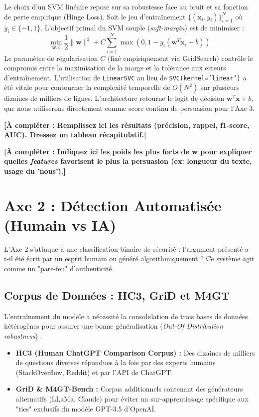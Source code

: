 \documentclass[11pt,a4paper]{article}
\begin{document}
Le choix d'un SVM linéaire repose sur sa robustesse face au bruit et sa fonction de perte empirique (Hinge Loss). Soit le jeu d'entraînement $\{(\mathbf{x}_i, y_i)\}_{i=1}^N$ où $y_i \in \{-1, 1\}$. L'objectif primal du SVM souple (\textit{soft-margin}) est de minimiser :
\begin{equation}
    \min_{\mathbf{w}, b} \frac{1}{2} \|\mathbf{w}\|^2 + C \sum_{i=1}^N \max(0, 1 - y_i(\mathbf{w}^T \mathbf{x}_i + b))
\end{equation}
Le paramètre de régularisation $C$ (fixé empiriquement via GridSearch) contrôle le compromis entre la maximisation de la marge et la tolérance aux erreurs d'entraînement. L'utilisation de \texttt{LinearSVC} au lieu de \texttt{SVC(kernel='linear')} a été vitale pour contourner la complexité temporelle de $O(N^2)$ sur plusieurs dizaines de milliers de lignes. L'architecture retourne le logit de décision $\mathbf{w}^T \mathbf{x} + b$, que nous utiliserons directement comme score continu de persuasion pour l'Axe 3.

\vspace{0.5cm}
\begin{tcolorbox}[colback=blue!5!white,colframe=blue!75!black,title=Résultats Expérimentaux Axe 1]
\textbf{[À compléter : Remplissez ici les résultats (précision, rappel, f1-score, AUC). Dressez un tableau récapitulatif.]}

\textbf{[À compléter : Indiquez ici les poids les plus forts de $\mathbf{w}$ pour expliquer quelles \textit{features} favorisent le plus la persuasion (ex: longueur du texte, usage du 'nous').]}
\end{tcolorbox}


\section{Axe 2 : Détection Automatisée (Humain vs IA)}

L'Axe 2 s'attaque à une classification binaire de sécurité : l'argument présenté a-t-il été écrit par un esprit humain ou généré algorithmiquement ? Ce système agit comme un "pare-feu" d'authenticité.

\subsection{Corpus de Données : HC3, GriD et M4GT}
L'entraînement du modèle a nécessité la consolidation de trois bases de données hétérogènes pour assurer une bonne généralisation (\textit{Out-Of-Distribution robustness}) :
\begin{itemize}
    \item \textbf{HC3 (Human ChatGPT Comparison Corpus) :} Des dizaines de milliers de questions diverses répondues à la fois par des experts humains (StackOverflow, Reddit) et par l'API de ChatGPT.
    \item \textbf{GriD \& M4GT-Bench :} Corpus additionnels contenant des générateurs alternatifs (LLaMa, Claude) pour éviter un sur-apprentissage spécifique aux "tics" exclusifs du modèle GPT-3.5 d'OpenAI.
\end{itemize}
\end{document}
